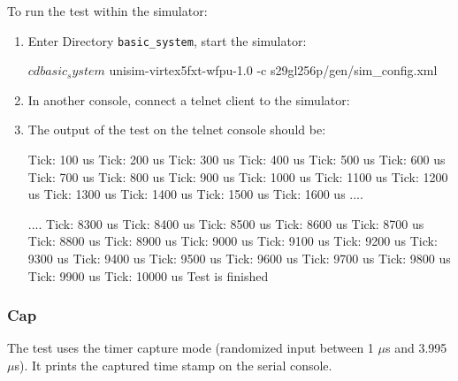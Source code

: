 \noindent To run the test within the simulator:
\begin{enumerate}
\item Enter Directory \texttt{basic\_system}, start the simulator:
\begin{script}
$ cd basic_system
$ unisim-virtex5fxt-wfpu-1.0 -c s29gl256p/gen/sim_config.xml
\end{script}
\item In another console, connect a telnet client to the simulator:
\item The output of the test on the telnet console should be:
\begin{script}
Tick: 100 us
Tick: 200 us
Tick: 300 us
Tick: 400 us
Tick: 500 us
Tick: 600 us
Tick: 700 us
Tick: 800 us
Tick: 900 us
Tick: 1000 us
Tick: 1100 us
Tick: 1200 us
Tick: 1300 us
Tick: 1400 us
Tick: 1500 us
Tick: 1600 us
....

....
Tick: 8300 us
Tick: 8400 us
Tick: 8500 us
Tick: 8600 us
Tick: 8700 us
Tick: 8800 us
Tick: 8900 us
Tick: 9000 us
Tick: 9100 us
Tick: 9200 us
Tick: 9300 us
Tick: 9400 us
Tick: 9500 us
Tick: 9600 us
Tick: 9700 us
Tick: 9800 us
Tick: 9900 us
Tick: 10000 us
Test is finished
\end{script}
\end{enumerate}

\subsubsection{Cap}

The test uses the timer capture mode (randomized input between 1 $\mu$s and 3.995 $\mu$s).
It prints the captured time stamp on the serial console.

